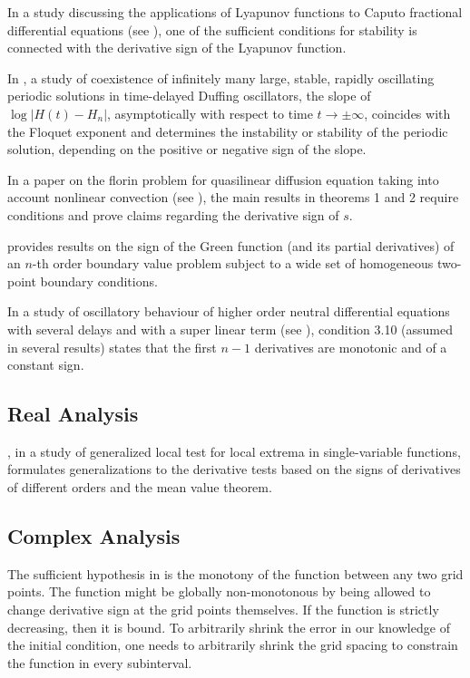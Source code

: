 \documentclass[11pt]{book}
\begin{document}
In a study discussing the applications of Lyapunov functions
to Caputo fractional differential equations (see \cite{agarwal2018applications}), one of the sufficient conditions for stability
is connected with the derivative sign of the Lyapunov function.

In \cite{fiedler2020coexistence}, a study of coexistence of infinitely many large, stable, rapidly oscillating periodic
solutions in time-delayed Duffing oscillators, the slope of $\log\left|H\left(t\right)-H_{n}\right|$,
asymptotically with respect to time $t\rightarrow\pm\infty$,
coincides with the Floquet exponent and determines the instability
or stability of the periodic solution, depending on the positive or
negative sign of the slope.

In a paper on the florin problem for quasilinear diffusion
equation taking into account nonlinear convection (see \cite{turaev2020florin}), the main results in theorems 1 and 2 require conditions and prove claims regarding the derivative
sign of $s$.

\cite{almenar2020sign} provides results on the sign of the Green
function (and its partial derivatives) of an $n$-th order boundary
value problem subject to a wide set of homogeneous two-point boundary
conditions.

In a study of oscillatory behaviour
of higher order neutral differential equations with several delays and with a super
linear term (see \cite{panda2020oscillatory}), condition 3.10 (assumed in
several results) states that the first $n-1$ derivatives are monotonic
and of a constant sign.


\subsection{Real Analysis}

\cite{gkioulekas2014generalized}, in a study of generalized local test for local extrema in single-variable functions, formulates generalizations to the
derivative tests based on the signs of derivatives of different orders
and the mean value theorem.


\subsection{Complex Analysis}

The sufficient hypothesis in \cite{gimeno2008euclidean} is the monotony
of the function between any two grid points. The function might
be globally non-monotonous by being allowed to change derivative sign
at the grid points themselves. If the function is strictly decreasing,
then it is bound. To arbitrarily shrink the error in our knowledge
of the initial condition, one needs to arbitrarily shrink the grid
spacing to constrain the function in every subinterval.
\end{document}
